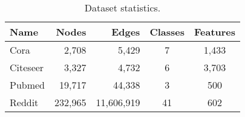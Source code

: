 \begin{table}[t]
  \caption{Dataset statistics.}
  \vspace{-4mm}
  \label{tab:table-data-sets}
  \begin{tabular}{lrrcc}
    \toprule
    Name & Nodes & Edges & Classes & Features \\
    \midrule
    Cora       &   2,708  &      5,429 &  7 & 1,433 \\
    Citeseer   &   3,327  &      4,732 &  6 & 3,703 \\
    Pubmed     &  19,717  &     44,338 &  3 &   500 \\
    Reddit     & 232,965  & 11,606,919 & 41 &   602 \\
     \bottomrule
\end{tabular}
\end{table}
